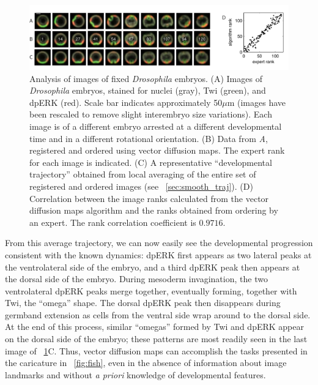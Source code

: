 \begin{figure}[t]
\includegraphics[width=\textwidth]{fig5}
\caption[Analysis of images of fixed \textit{Drosophila} embryos]{Analysis of images of fixed \textit{Drosophila} embryos. {(A)} Images of \textit{ Drosophila} embryos, stained for nuclei (gray), Twi (green), and dpERK (red). Scale bar indicates approximately 50$\mu$m (images have been rescaled to remove slight interembryo size variations).  Each image is of a different embryo arrested at a different developmental time and in a different rotational orientation. {(B)} Data from {\it A}, registered and ordered using vector diffusion maps. The expert rank for each image is indicated. {(C)} A representative ``developmental trajectory'' obtained from local averaging of the entire set of registered and ordered images (see \sec~\ref{sec:smooth_traj}). {(D)} Correlation between the image ranks calculated from the vector diffusion maps algorithm and the ranks obtained from ordering by an expert. The rank correlation coefficient is $0.9716$. }
\label{fig:drosophila_fixed_images}
\end{figure}


From this average trajectory, we can now easily see the developmental progression consistent with the known dynamics:
%
dpERK first appears as two lateral peaks at the ventrolateral side of the embryo, and a third dpERK peak then appears at the dorsal side of the embryo.
%
During mesoderm invagination, the two ventrolateral dpERK peaks merge together, eventually forming, together with Twi, the ``omega'' shape.
%
The dorsal dpERK peak then disappears during germband extension as cells from the ventral side wrap around to the dorsal side.
%
At the end of this process, similar ``omegas'' formed by Twi and dpERK appear on the dorsal side of the embryo; these patterns are most readily seen in the last image of \fig~\ref{fig:drosophila_fixed_images}C.
%
Thus, vector diffusion maps can accomplish the tasks presented in the caricature in \fig~\ref{fig:fish}, even in the absence of information about image landmarks and without {\it a priori} knowledge of developmental features.

